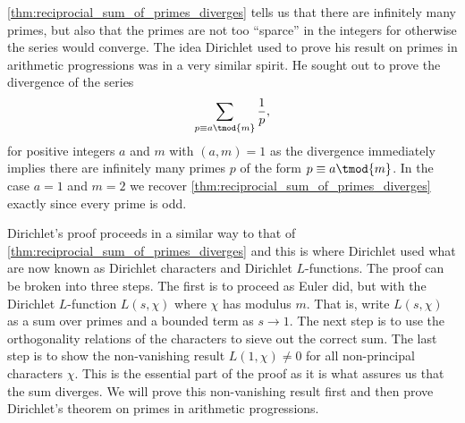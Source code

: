       \cref{thm:reciprocial_sum_of_primes_diverges} tells us that there are infinitely many primes, but also that the primes are not too ``sparce'' in the integers for otherwise the series would converge. The idea Dirichlet used to prove his result on primes in arithmetic progressions was in a very similar spirit. He sought out to prove the divergence of the series
      \[
        \sum_{p \equiv a \tmod{m}}\frac{1}{p},
      \]
      for positive integers $a$ and $m$ with $(a,m) = 1$ as the divergence immediately implies there are infinitely many primes $p$ of the form $p \equiv a \tmod{m}$. In the case $a = 1$ and $m = 2$ we recover \cref{thm:reciprocial_sum_of_primes_diverges} exactly since every prime is odd.

      Dirichlet's proof proceeds in a similar way to that of \cref{thm:reciprocial_sum_of_primes_diverges} and this is where Dirichlet used what are now known as Dirichlet characters and Dirichlet $L$-functions. The proof can be broken into three steps. The first is to proceed as Euler did, but with the Dirichlet $L$-function $L(s,\chi)$ where $\chi$ has modulus $m$. That is, write $L(s,\chi)$ as a sum over primes and a bounded term as $s \to 1$. The next step is to use the orthogonality relations of the characters to sieve out the correct sum. The last step is to show the non-vanishing result $L(1,\chi) \neq 0$ for all non-principal characters $\chi$. This is the essential part of the proof as it is what assures us that the sum diverges. We will prove this non-vanishing result first and then prove Dirichlet's theorem on primes in arithmetic progressions.


